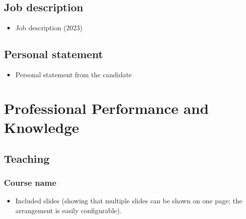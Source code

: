 \documentclass[12pt,oneside]{book}
\begin{document}


\section{Job description}

\begin{itemize}
  \item Job description (2023)
\end{itemize}



\section{Personal statement}

\begin{itemize}
  \item Personal statement from the candidate
\end{itemize}



\renewcommand\thechapter{A}
\chapter{Professional Performance and Knowledge}

\section{Teaching}

\subsection{Course name}

\begin{itemize}
  \item Included slides (showing that multiple slides can be shown on one page; the arrangement is easily configurable).
\end{itemize}


\end{document}
